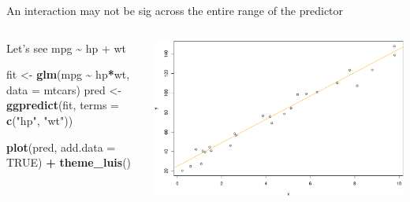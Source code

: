 \documentclass[australian,ignorenonframetext,aspectratio=169]{beamer}
\newenvironment{Shaded}{\begin{snugshade}}{\end{snugshade}}
\newcommand{\DataTypeTok}[1]{\textcolor[rgb]{0.13,0.29,0.53}{#1}}
\newcommand{\KeywordTok}[1]{\textcolor[rgb]{0.13,0.29,0.53}{\textbf{#1}}}
\newcommand{\NormalTok}[1]{#1}
\newcommand{\OperatorTok}[1]{\textcolor[rgb]{0.81,0.36,0.00}{\textbf{#1}}}
\newcommand{\OtherTok}[1]{\textcolor[rgb]{0.56,0.35,0.01}{#1}}
\newcommand{\StringTok}[1]{\textcolor[rgb]{0.31,0.60,0.02}{#1}}
\begin{document}
\begin{frame}[fragile]{An interaction may not be sig across the entire
range of the predictor}
\protect\hypertarget{an-interaction-may-not-be-sig-across-the-entire-range-of-the-predictor}{}

\begin{columns}[T]
\begin{column}{0.5\textwidth}
\begin{block}{Let's see mpg \textasciitilde{} hp + wt}

\tiny

\begin{Shaded}
\begin{Highlighting}[]
\NormalTok{fit \textless{}{-}}\StringTok{ }\KeywordTok{glm}\NormalTok{(mpg }\OperatorTok{\textasciitilde{}}\StringTok{ }\NormalTok{hp}\OperatorTok{*}\NormalTok{wt, }\DataTypeTok{data =}\NormalTok{ mtcars)}
\NormalTok{pred \textless{}{-}}\StringTok{ }\KeywordTok{ggpredict}\NormalTok{(fit, }\DataTypeTok{terms =} \KeywordTok{c}\NormalTok{(}\StringTok{"hp"}\NormalTok{, }\StringTok{"wt"}\NormalTok{))}

\KeywordTok{plot}\NormalTok{(pred, }\DataTypeTok{add.data =} \OtherTok{TRUE}\NormalTok{) }\OperatorTok{+}
\StringTok{  }\KeywordTok{theme\_luis}\NormalTok{()}
\end{Highlighting}
\end{Shaded}

\end{block}
\end{column}

\begin{column}{0.5\textwidth}
\includegraphics{../graphs/unnamed-chunk-18-1.pdf}
\end{column}
\end{columns}

\end{frame}
\end{document}

